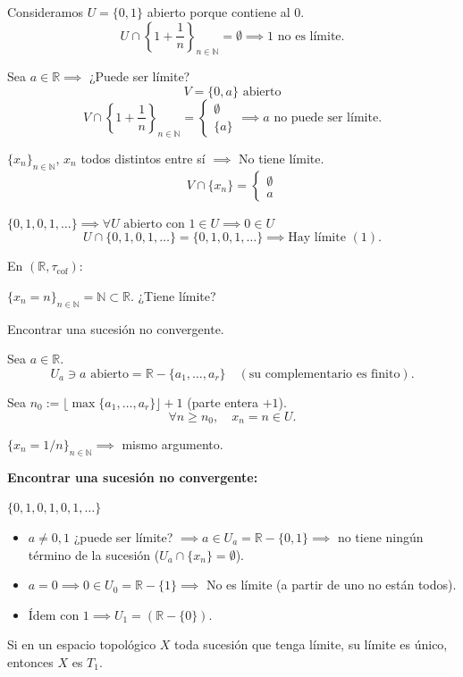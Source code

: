 \begin{sol}
Consideramos $U = \{0, 1\}$ abierto porque contiene al $0$.
\[
    U \cap \left\{1 + \frac{1}{n}\right\}_{n \in \mathbb{N}} = \emptyset \implies 1 \text{ no es límite} \text{}.
\]

Sea $a \in \mathbb{R} \implies$ ¿Puede ser límite?
\[
    V = \{0, a\} \text{ abierto} \text{}
\]
\[
    V \cap \left\{1 + \frac{1}{n}\right\}_{n \in \mathbb{N}} = \begin{cases} \emptyset \\ \{a\} \end{cases} \implies a \text{ no puede ser límite} \text{}.
\]

$\{x_n\}_{n \in \mathbb{N}}$, $x_n$ todos distintos entre sí $\implies$ No tiene límite.
\[
    V \cap \{x_n\} = \begin{cases} \emptyset \\ a \end{cases} \text{}
\]

\hrulefill

\medskip
$\{0, 1, 0, 1, \ldots\} \implies \forall U \text{ abierto con } 1 \in U \implies 0 \in U$
\[
    U \cap \{0, 1, 0, 1, \ldots\} = \{0, 1, 0, 1, \ldots\} \implies \text{Hay límite } (1) \text{}.
\]
\end{sol}

\bigskip

\begin{ejer}[67]
En $(\mathbb{R}, \tau_{\text{cof}})$:

$\{x_n = n\}_{n \in \mathbb{N}} = \mathbb{N} \subset \mathbb{R}$. ¿Tiene límite?

Encontrar una sucesión no convergente.
\end{ejer}

\begin{sol}
Sea $a \in \mathbb{R}$.
\[
    U_a \ni a \text{ abierto} = \mathbb{R} - \{a_1, \ldots, a_r\} \quad (\text{su complementario es finito}) \text{}.
\]

Sea $n_0 := \lfloor \max\{a_1, \ldots, a_r\} \rfloor + 1$ (parte entera $+ 1$).
\[
    \forall n \ge n_0, \quad x_n = n \in U \text{}.
\]

$\{x_n = 1/n\}_{n \in \mathbb{N}} \implies$ mismo argumento.

\medskip
\textbf{Encontrar una sucesión no convergente:}

$\{0, 1, 0, 1, 0, 1, \ldots\}$

\begin{itemize}
    \item $a \ne 0, 1$ ¿puede ser límite? $\implies a\in U_a = \mathbb{R} - \{0, 1\} \implies$ no tiene ningún término de la sucesión ($U_a \cap \{x_n\} = \emptyset$).
    \item $a = 0 \implies 0 \in U_0 = \mathbb{R} - \{1\} \implies$ No es límite (a partir de uno no están todos).
    \item Ídem con $1 \implies U_1 = (\mathbb{R} - \{0\})$.
\end{itemize}
\end{sol}
\begin{ejer}[70]
Si en un espacio topológico $X$ toda sucesión que tenga límite, su límite es único, entonces $X$ es $T_1$.
\end{ejer}

